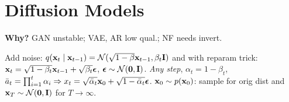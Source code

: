 \section{Diffusion Models}
\textbf{Why?} GAN unstable; VAE, AR low qual.; NF needs invert.

\begin{definition}[Diffusion]
    Add noise: \(q(\vb{x}_{t}\mid \vb{x}_{t-1}) = \operatorname{\mathcal{N}}(\sqrt{1 - \beta}\vb{x}_{t-1}, \beta_t \vb{I})\) and with reparam trick:
    \(\vb{x}_t = \sqrt{1 - \beta_t}\vb{x}_{t-1} + \sqrt{\beta_t}\vb*{\epsilon}\), \(\vb*{\epsilon} \sim \operatorname{\mathcal{N}}(\vb{0}, \vb{I})\).
    \textit{Any step}, \(\alpha_t = 1 - \beta_t\), \(\bar a_t = \prod_{i=1}^t \alpha_i \Rightarrow x_t = \sqrt{\bar\alpha_t}\vb{x}_0 + \sqrt{1 - \bar\alpha_t}\vb*{\epsilon}\).
    \(\vb{x}_0 \sim p(\vb{x}_0)\): sample for orig dist and \(\vb{x}_T \sim \operatorname{\mathcal{N}}(\vb{0}, \vb{I})\) for \(T \to \infty\).
\end{definition}




